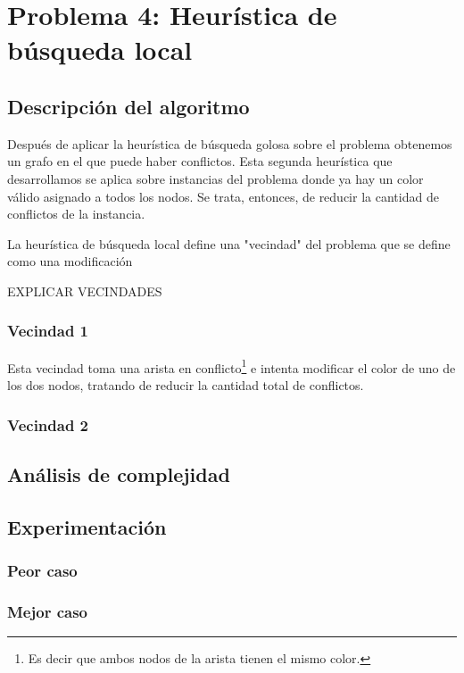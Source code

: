 \section{Problema 4: Heurística de búsqueda local}

\subsection{Descripción del algoritmo}

Después de aplicar la heurística de búsqueda golosa sobre el problema obtenemos un grafo en el que puede haber conflictos. Esta segunda heurística que desarrollamos se aplica sobre instancias del problema donde ya hay un color válido asignado a todos los nodos. Se trata, entonces, de reducir la cantidad de conflictos de la instancia.

La heurística de búsqueda local define una "vecindad" del problema que se define como una modificación 

EXPLICAR VECINDADES

\subsubsection{Vecindad 1}

Esta vecindad toma una arista en conflicto\footnote{Es decir que ambos nodos de la arista tienen el mismo color.} e intenta modificar el color de uno de los dos nodos, tratando de reducir la cantidad total de conflictos.

% 

\subsubsection{Vecindad 2}

\subsection{Análisis de complejidad}






\subsection{Experimentación}


\subsubsection{Peor caso}



\subsubsection{Mejor caso}
